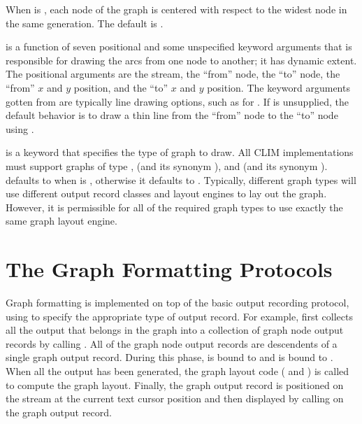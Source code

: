 When  is , each node of the graph is centered with
respect to the widest node in the same generation.  The default is .

 is a function of seven positional and some unspecified keyword
arguments that is responsible for drawing the arcs from one node to another; it
has dynamic extent.  The positional arguments are the stream, the ``from'' node,
the ``to'' node, the ``from'' $x$ and $y$ position, and the ``to'' $x$ and $y$
position.  The keyword arguments gotten from  are
typically line drawing options, such as for .  If 
is unsupplied, the default behavior is to draw a thin line from the ``from'' node
to the ``to'' node using .

 is a keyword that specifies the type of graph to draw.  All
CLIM implementations must support graphs of type ,
 (and its synonym ), and
 (and its synonym ).  
defaults to  when  is , otherwise
it defaults to .  Typically, different graph types will use different
output record classes and layout engines to lay out the graph.  However, it is
permissible for all of the required graph types to use exactly the same graph
layout engine.


\section {The Graph Formatting Protocols}

Graph formatting is implemented on top of the basic output recording protocol,
using  to specify the appropriate type of output
record.  For example,  first collects all the output
that belongs in the graph into a collection of graph node output records by
calling .  All of the graph node output records are
descendents of a single graph output record.  During this phase,
 is bound to  and  is bound
to .  When all the output has been generated, the graph layout code
( and ) is called to compute the
graph layout.  Finally, the graph output record is positioned on the stream at
the current text cursor position and then displayed by calling  on
the graph output record.


